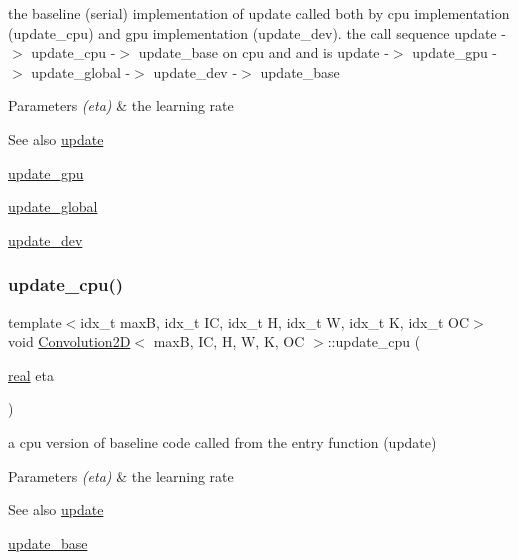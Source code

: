 the baseline (serial) implementation of update called both by cpu implementation (update\+\_\+cpu) and gpu implementation (update\+\_\+dev). the call sequence update -\/$>$ update\+\_\+cpu -\/$>$ update\+\_\+base on cpu and and is update -\/$>$ update\+\_\+gpu -\/$>$ update\+\_\+global -\/$>$ update\+\_\+dev -\/$>$ update\+\_\+base 


\begin{DoxyParams}{Parameters}
{\em (eta)} & the learning rate \\
\hline
\end{DoxyParams}
\begin{DoxySeeAlso}{See also}
\hyperlink{structConvolution2D_ac9fd666f96904bb7f62dc39cebae7a25}{update} 

\hyperlink{structConvolution2D_af189fb21ba3ecb6b9f7553c414f35446}{update\+\_\+gpu} 

\hyperlink{linear_8h_a810703be28422bb9483665cbdbafd968}{update\+\_\+global} 

\hyperlink{structConvolution2D_a724e0e31fb47f11af0f022adf983ca41}{update\+\_\+dev} 
\end{DoxySeeAlso}
\mbox{\label{structConvolution2D_a3768142c7d9dc9649b6afb1d2321449a}} 
\subsubsection{\texorpdfstring{update\+\_\+cpu()}{update\_cpu()}}
{\footnotesize\ttfamily template$<$idx\+\_\+t maxB, idx\+\_\+t IC, idx\+\_\+t H, idx\+\_\+t W, idx\+\_\+t K, idx\+\_\+t OC$>$ \\
void \hyperlink{structConvolution2D}{Convolution2D}$<$ maxB, IC, H, W, K, OC $>$\+::update\+\_\+cpu (\begin{DoxyParamCaption}\item[{\hyperlink{vgg__util_8h_a1082d08aaa761215ec83e7149f27ad16}{real}}]{eta }\end{DoxyParamCaption})\hspace{0.3cm}{\ttfamily [inline]}}



a cpu version of baseline code called from the entry function (update) 


\begin{DoxyParams}{Parameters}
{\em (eta)} & the learning rate \\
\hline
\end{DoxyParams}
\begin{DoxySeeAlso}{See also}
\hyperlink{structConvolution2D_ac9fd666f96904bb7f62dc39cebae7a25}{update} 

\hyperlink{structConvolution2D_a5134826f56423c7629434f4c9ea40a1f}{update\+\_\+base} 
\end{DoxySeeAlso}
\mbox{\label{structConvolution2D_a724e0e31fb47f11af0f022adf983ca41}} 
